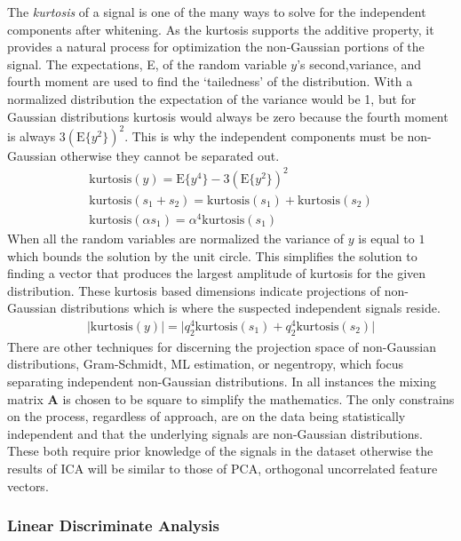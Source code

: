 The \emph{kurtosis} of a signal is one of the many ways to solve for the independent components after whitening. As the kurtosis supports the additive property, it provides a natural process for optimization the non-Gaussian portions of the signal. The expectations, E, of the random variable $y$'s second,variance, and fourth moment are used to find the `tailedness' of the distribution. With a normalized distribution the expectation of the variance would be 1, but for Gaussian distributions kurtosis would always be zero because the fourth moment is always $3(\text{E}\{y^{2}\})^{2}$. This is why the independent components must be non-Gaussian otherwise they cannot be separated out.
\begin{gather}
\text{kurtosis}(y) = \text{E}\{y^{4}\} - 3(\text{E}\{y^{2}\})^{2} \nonumber \\
\text{kurtosis}(s_{1}+s_{2}) = \text{kurtosis}(s_{1}) + \text{kurtosis}(s_{2}) \nonumber \\
\text{kurtosis}(\alpha s_{1}) = \alpha^{4}\text{kurtosis}(s_{1})
\end{gather}
When all the random variables are normalized the variance of $y$ is equal to $1$ which bounds the solution by the unit circle. This simplifies the solution to finding a vector that produces the largest amplitude of kurtosis for the given distribution. These kurtosis based dimensions indicate projections of non-Gaussian distributions which is where the suspected independent signals reside.
\begin{gather}
\lvert\text{kurtosis}(y)\rvert = \lvert q_{2}^{4}\text{kurtosis}(s_{1}) + q_{2}^{4}\text{kurtosis}(s_{2})\rvert
\end{gather}
There are other techniques for discerning the projection space of non-Gaussian distributions, Gram-Schmidt, \ac{ML} estimation, or negentropy, which focus separating independent non-Gaussian distributions. In all instances the mixing matrix $\bm{A}$ is chosen to be square to simplify the mathematics. The only constrains on the process, regardless of approach, are on the data being statistically independent and that the underlying signals are non-Gaussian distributions. These both require prior knowledge of the signals in the dataset otherwise the results of \ac{ICA} will be similar to those of \ac{PCA}, orthogonal uncorrelated feature vectors.

\subsubsection{Linear Discriminate Analysis}

